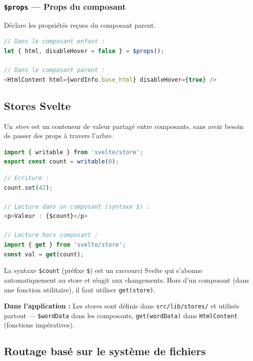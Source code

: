 \subsubsection{\texttt{\$props} --- Props du composant}

Déclare les propriétés reçues du composant parent.

\begin{lstlisting}[language=javascript]
// Dans le composant enfant :
let { html, disableHover = false } = $props();

// Dans le composant parent :
<HtmlContent html={wordInfo.base_html} disableHover={true} />
\end{lstlisting}

\subsection{Stores Svelte}

Un \emph{store} est un conteneur de valeur partagé entre composants, sans avoir besoin de passer des props à travers l'arbre.

\begin{lstlisting}[language=javascript, title=Creer un store]
import { writable } from 'svelte/store';
export const count = writable(0);
\end{lstlisting}

\begin{lstlisting}[language=javascript, title=Utiliser un store]
// Ecriture :
count.set(42);

// Lecture dans un composant (syntaxe $) :
<p>Valeur : {$count}</p>

// Lecture hors composant :
import { get } from 'svelte/store';
const val = get(count);
\end{lstlisting}

La syntaxe \texttt{\$count} (préfixe \texttt{\$}) est un raccourci Svelte qui s'abonne automatiquement au store et réagit aux changements. Hors d'un composant (dans une fonction utilitaire), il faut utiliser \texttt{get(store)}.

\textbf{Dans l'application :} Les stores sont définis dans \texttt{src/lib/stores/} et utilisés partout --- \texttt{\$wordData} dans les composants, \texttt{get(wordData)} dans \texttt{HtmlContent} (fonctions impératives).

\subsection{Routage basé sur le système de fichiers}

